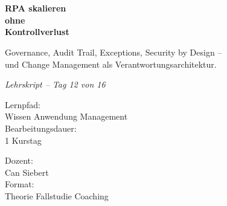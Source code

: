 \documentclass[11pt,a4paper,oneside]{article}
\newcommand{\caveatfontfallback}{\itshape}
\newcommand\caveatfont{\caveatfontfallback}%
\begin{document}
\begin{titlepage}
  \pagestyle{empty}
  \vspace*{1.5cm}
  \\[2pt]
  \noindent{\color{lpAccent}\rule{\linewidth}{1.2pt}}\\[4pt]

  \vspace{3cm}
  {\sffamily\fontsize{30}{34}\selectfont\bfseries\color{lpInk}RPA skalieren\\ohne\\Kontrollverlust\par}

  \vspace{0.7cm}
  {\sffamily\large\color{lpGray}Governance, Audit Trail, Exceptions, Security by Design --\\und Change Management als Verantwortungsarchitektur.\par}

  \vspace{1.5cm}
  {\caveatfont\LARGE\color{lpAmber}Lehrskript -- Tag 12 von 16}\par

  \vfill

  \noindent\begin{minipage}{0.55\linewidth}
    {\sffamily\footnotesize\color{lpGray}Lernpfad:}\\
    {\sffamily\small\color{lpInk}Wissen \textrightarrow{} Anwendung \textrightarrow{} Management}\\[10pt]
    {\sffamily\footnotesize\color{lpGray}Bearbeitungsdauer:}\\
    {\sffamily\small\color{lpInk}1 Kurstag}
  \end{minipage}\hfill
  \begin{minipage}{0.4\linewidth}
    \raggedleft
    {\sffamily\footnotesize\color{lpGray}Dozent:}\\
    {\sffamily\small\color{lpInk}Can Siebert}\\[10pt]
    {\sffamily\footnotesize\color{lpGray}Format:}\\
    {\sffamily\small\color{lpInk}Theorie \textperiodcentered{} Fallstudie \textperiodcentered{} Coaching}
  \end{minipage}

  \vspace{0.5cm}
  \noindent{\color{lpAccent}\rule{\linewidth}{0.6pt}}
\end{titlepage}
\end{document}
